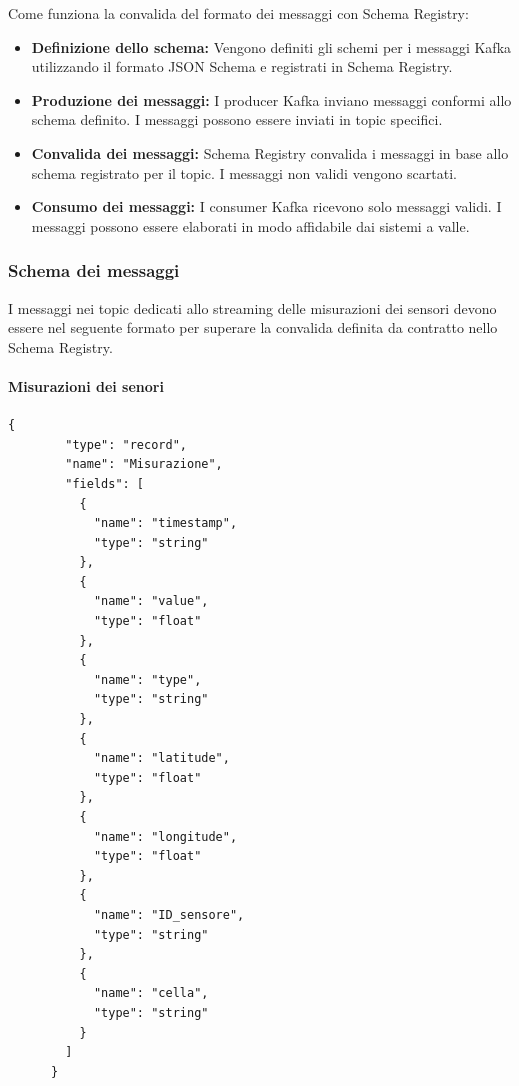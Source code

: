 Come funziona la convalida del formato dei messaggi con Schema Registry:
\begin{itemize}
    \item \textbf{Definizione dello schema:} Vengono definiti gli schemi per i messaggi Kafka utilizzando il formato JSON Schema e registrati in Schema Registry.
    \item \textbf{Produzione dei messaggi:} I producer Kafka inviano messaggi conformi allo schema definito. I messaggi possono essere inviati in topic specifici.
    \item \textbf{Convalida dei messaggi:} Schema Registry convalida i messaggi in base allo schema registrato per il topic. I messaggi non validi vengono scartati.
    \item \textbf{Consumo dei messaggi:} I consumer Kafka ricevono solo messaggi validi. I messaggi possono essere elaborati in modo affidabile dai sistemi a valle.
\end{itemize}

\subsubsection{Schema dei messaggi}\label{sec:schema_registry_sez_schema}
I messaggi nei topic dedicati allo streaming delle misurazioni dei sensori devono essere nel seguente formato per superare la convalida definita da contratto nello Schema Registry.
\paragraph{Misurazioni dei senori}
\begin{lstlisting}[style=code]
    {
        "type": "record",
        "name": "Misurazione",
        "fields": [
          {
            "name": "timestamp",
            "type": "string"
          },
          {
            "name": "value",
            "type": "float"
          },
          {
            "name": "type",
            "type": "string"
          },
          {
            "name": "latitude",
            "type": "float"
          },
          {
            "name": "longitude",
            "type": "float"
          },
          {
            "name": "ID_sensore",
            "type": "string"
          },
          {
            "name": "cella",
            "type": "string"
          }
        ]
      }
\end{lstlisting}


